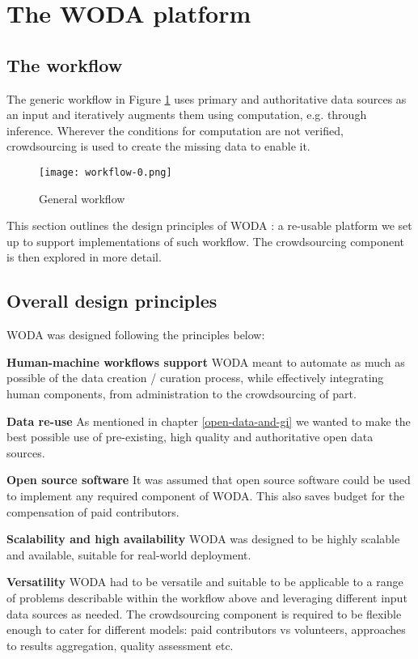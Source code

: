 \section{The WODA platform}

\subsection{The workflow}
\label{generic-workflow}

The generic workflow in Figure \ref{fig:workflow_0} uses primary and authoritative data sources as an input and iteratively augments them using computation, e.g. through inference. Wherever the conditions for computation are not verified, crowdsourcing is used to create the missing data to enable it. 

\begin{figure}
	\texttt{[image: workflow-0.png]}
	\caption{General workflow}
	\label{fig:workflow_0}
\end{figure}

This section outlines the design principles of WODA : a re-usable platform we set up to support implementations of such workflow. The crowdsourcing component is then explored in more detail.

\subsection{Overall design principles}
\label{desing-principles}

WODA was designed following the principles below:

\textbf{Human-machine workflows support} WODA meant to automate as much as possible of the data creation / curation process, while effectively integrating human components, from administration to the crowdsourcing of part.

\textbf{Data re-use} As mentioned in chapter \ref{open-data-and-gi} we wanted to make the best possible use of pre-existing, high quality and authoritative open data sources.

\textbf{Open source software} It was assumed that open source software could be used to implement any required component of WODA. This also saves budget for the compensation of paid contributors.

\textbf{Scalability and high availability} WODA was designed to be highly scalable and available, suitable for real-world deployment.

\textbf{Versatility} WODA had to be versatile and suitable to be applicable to a range of problems describable within the workflow above and leveraging different input data sources as needed. The crowdsourcing component is required to be flexible enough to cater for different models: paid contributors vs volunteers, approaches to results aggregation, quality assessment etc.

